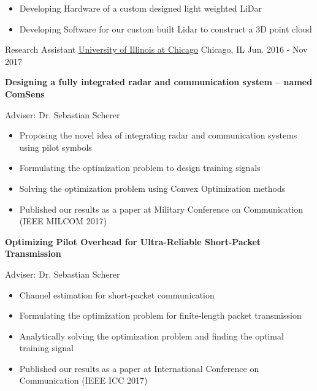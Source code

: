 \begin{cventries}
{\begin{cvitems}
		\begin{itemize}
			\item Developing Hardware of a custom designed light weighted LiDar
			\item Developing Software for our custom built Lidar to construct a 3D point cloud
		\end{itemize}
      \end{cvitems}
    }






  \cventry
    {Research Assistant} %
    {\href{http://www.uic.edu}{University of Illinois at Chicago}} %
    {Chicago, IL} %
    {Jun. 2016 - Nov 2017} %
    {
      \begin{cvitems} %
		\item \textbf{Designing a fully integrated radar and communication system – named ComSens} \begin{flushright} {\color{awesome} Adviser: Dr. Sebastian Scherer} \end{flushright}
		\begin{itemize}
				\item Proposing the novel idea of integrating radar and communication systems using pilot symbols
				\item Formulating the optimization problem to design training signals
				\item Solving the optimization problem using Convex Optimization methods
				\item Published our results as a paper at Military Conference on Communication (IEEE MILCOM 2017)
		\end{itemize}
		\item \textbf{Optimizing Pilot Overhead for Ultra-Reliable Short-Packet Transmission} \begin{flushright} {\color{awesome} Adviser: Dr. Sebastian Scherer} \end{flushright}
		\begin{itemize}
				\item Channel estimation for short-packet communication
				\item Formulating  the optimization problem for finite-length packet transmission
				\item Analytically solving the optimization problem and finding the optimal training signal
				\item Published our results as a paper at International Conference on Communication (IEEE ICC 2017)
		\end{itemize}				      
      \end{cvitems}
    }






\end{cventries}
